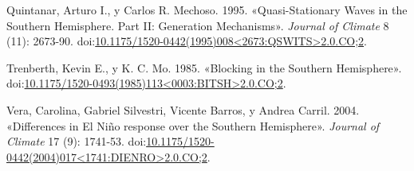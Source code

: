 \documentclass[spanish,a4paper]{book}
\begin{document}
\hypertarget{ref-Quintanar1995}{}
Quintanar, Arturo I., y Carlos R. Mechoso. 1995. «Quasi-Stationary Waves
in the Southern Hemisphere. Part II: Generation Mechanisms».
\emph{Journal of Climate} 8 (11): 2673-90.
doi:\href{https://doi.org/10.1175/1520-0442(1995)008\%3C2673:QSWITS\%3E2.0.CO;2}{10.1175/1520-0442(1995)008\textless{}2673:QSWITS\textgreater{}2.0.CO;2}.

\hypertarget{ref-Trenberth1985}{}
Trenberth, Kevin E., y K. C. Mo. 1985. «Blocking in the Southern
Hemisphere».
doi:\href{https://doi.org/10.1175/1520-0493(1985)113\%3C0003:BITSH\%3E2.0.CO;2}{10.1175/1520-0493(1985)113\textless{}0003:BITSH\textgreater{}2.0.CO;2}.

\hypertarget{ref-Vera2004}{}
Vera, Carolina, Gabriel Silvestri, Vicente Barros, y Andrea Carril.
2004. «Differences in El Niño response over the Southern Hemisphere».
\emph{Journal of Climate} 17 (9): 1741-53.
doi:\href{https://doi.org/10.1175/1520-0442(2004)017\%3C1741:DIENRO\%3E2.0.CO;2}{10.1175/1520-0442(2004)017\textless{}1741:DIENRO\textgreater{}2.0.CO;2}.
\end{document}
